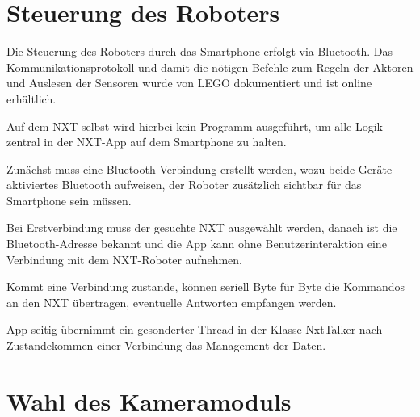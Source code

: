 \pagebreak

\section{Steuerung des Roboters}

Die Steuerung des Roboters durch das Smartphone erfolgt via Bluetooth.
Das Kommunikationsprotokoll und damit die nötigen Befehle zum Regeln der Aktoren und Auslesen der Sensoren wurde von LEGO dokumentiert und ist online erhältlich\cite{nxt_comm_protocol}.

Auf dem NXT selbst wird hierbei kein Programm ausgeführt, um alle Logik zentral in der NXT-App auf dem Smartphone zu halten.

Zunächst muss eine Bluetooth-Verbindung erstellt werden, wozu beide Geräte aktiviertes Bluetooth aufweisen, der Roboter zusätzlich sichtbar für das Smartphone sein müssen.

Bei Erstverbindung muss der gesuchte NXT ausgewählt werden, danach ist die Bluetooth-Adresse bekannt und die App kann ohne Benutzerinteraktion eine Verbindung mit dem NXT-Roboter aufnehmen.

Kommt eine Verbindung zustande, können seriell Byte für Byte die Kommandos an den NXT übertragen, eventuelle Antworten empfangen werden.

App-seitig übernimmt ein gesonderter Thread in der Klasse NxtTalker nach Zustandekommen einer Verbindung das Management der Daten.

\section{Wahl des Kameramoduls}
\label{sec:Kamera}

